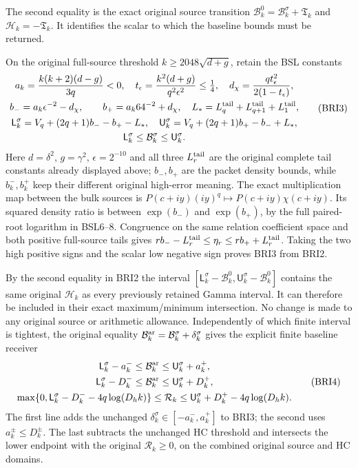\documentclass[11pt,a4paper]{article}
\begin{document}
The second equality is the exact original source transition
$\mathcal B_k^0=\mathcal B_k^\sigma+\mathfrak T_k$ and
$\mathcal H_k=-\mathfrak T_k$. It identifies the scalar to
which the baseline bounds must be returned.

On the original full-source threshold
$k\geq2048\sqrt{d+g}$, retain the BSL constants
\[
\begin{gathered}
 a_k=\frac{k(k+2)(d-g)}{3q}<0,\quad
 t_\epsilon=\frac{k^2(d+g)}{q^2\epsilon^2}\leq\tfrac14,
 \quad d_\chi=\frac{qt_\epsilon^2}{2(1-t_\epsilon)},\\
 b_-=a_k\epsilon^{-2}-d_\chi,
 \qquad b_+=a_k64^{-2}+d_\chi,
 \quad L_*=L_q^{\rm tail}+L_{q+1}^{\rm tail}+L_1^{\rm tail},\\
 \mathsf L_k^\sigma=V_q+(2q+1)b_- -b_+-L_*,\quad
 \mathsf U_k^\sigma=V_q+(2q+1)b_+ -b_-+L_*,\\
 \mathsf L_k^\sigma\leq\mathcal B_k^\sigma
                                  \leq\mathsf U_k^\sigma.
\end{gathered}\tag{BRI3}
\]
Here $d=\delta^2$, $g=\gamma^2$, $\epsilon=2^{-10}$ and
all three $L_r^{\rm tail}$ are the original complete tail constants
already displayed above; $b_-,b_+$ are the packet density bounds,
while $b_k^-,b_k^+$ keep their different original high-error meaning.
The exact multiplication map between the bulk sources is
$P(c+iy)(iy)^q\mapsto P(c+iy)\chi(c+iy)$.
Its squared density ratio is between $\exp(b_-)$ and
$\exp(b_+)$, by the full paired-root logarithm in BSL6--8.
Congruence on the same relation coefficient space and both positive
full-source tails gives $rb_- -L_r^{\rm tail}\leq\eta_r
\leq rb_++L_r^{\rm tail}$. Taking the two high positive signs
and the scalar low negative sign proves BRI3 from BRI2.

By the second equality in BRI2 the interval
$[\mathsf L_k^\sigma-\mathcal B_k^0,
\mathsf U_k^\sigma-\mathcal B_k^0]$ contains the same original
$\mathcal H_k$ as every previously retained Gamma interval.
It can therefore be included in their exact maximum/minimum
intersection. No change is made to any original source or
arithmetic allowance. Independently of which finite interval is
tightest, the original equality
$\mathcal B_k^{\rm ar}=\mathcal B_k^\sigma+\delta_k^\sigma$
gives the explicit finite baseline receiver
\[
\begin{gathered}
 \mathsf L_k^\sigma-a_k^-\leq\mathcal B_k^{\rm ar}
                                   \leq\mathsf U_k^\sigma+a_k^+,\\
 \mathsf L_k^\sigma-D_k^-\leq\mathcal B_k^{\rm ar}
                                   \leq\mathsf U_k^\sigma+D_k^+,\\
 \max\{0,\mathsf L_k^\sigma-D_k^- -4q\log(D_hk)\}
 \leq\mathcal R_k
 \leq\mathsf U_k^\sigma+D_k^+ -4q\log(D_hk).
\end{gathered}\tag{BRI4}
\]
The first line adds the unchanged
$\delta_k^\sigma\in[-a_k^-,a_k^+]$ to BRI3; the second
uses $a_k^\pm\leq D_k^\pm$. The last subtracts the unchanged
HC threshold and intersects the lower endpoint with the original
$\mathcal R_k\geq0$, on the combined original source and HC domains.
\end{document}
